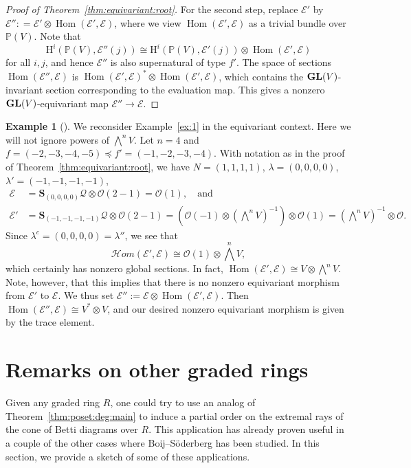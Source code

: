 \documentclass[12pt]{amsart}
\theoremstyle{definition}
\newtheorem{eg}[equation]{Example}
\newenvironment{example}[1][]{\begin{eg}[#1] \pushQED{\qed}}{\popQED \end{eg}}
\newcommand{\Hom}{\operatorname{Hom}}
\newcommand{\sheafHom}{\mathcal{H}om}
\newcommand{\Hs}{\mathrm{H}}
\newcommand{\EE}{\mathcal{E}}
\newcommand{\cO}{{\mathcal O}}
\newcommand{\PP}{\mathbb{P}}
\newcommand{\cQ}{\mathcal{Q}}
\newcommand{\Sc}{\mathbf{S}}
\newcommand{\GL}{{\bf GL}}
\begin{document}
\begin{proof}[Proof of Theorem~\ref{thm:equivariant:root}]
For the second step, replace $\EE'$ by $\EE'' : = \EE' \otimes
\Hom(\EE', \EE)$, where we view $\Hom(\EE', \EE)$ as a trivial bundle
over $\PP(V)$.  Note that
\[
\Hs^i(\PP(V),\EE''(j))\cong \Hs^i(\PP(V),\EE'(j))\otimes \Hom(\EE',
\EE)
\]
for all $i,j$, and hence $\EE''$ is also supernatural of type $f'$.
The space of sections $\Hom(\EE'', \EE)$ is $\Hom(\EE', \EE)^* \otimes
\Hom(\EE', \EE)$, which contains the $\GL(V)$-invariant section
corresponding to the evaluation map. This gives a nonzero
$\GL(V)$-equivariant map $\EE'' \to \EE$.
\end{proof}

\begin{example}
  We reconsider Example~\ref{ex:1} in the equivariant context. Here we
  will not ignore powers of $\bigwedge^n V$.  Let $n=4$ and
  $f=(-2,-3,-4,-5) \preceq f'=(-1,-2,-3,-4)$.  With notation as in the
  proof of Theorem~\ref{thm:equivariant:root}, we have $N=(1,1,1,1)$,
  $\lambda=(0,0,0,0)$, $\lambda'=(-1,-1,-1,-1)$,
  \begin{align*}
    \EE&=\Sc_{(0,0,0,0)}\cQ \otimes \cO(2-1)=\cO(1), \quad \text{and}\\
    \EE'&=\Sc_{(-1,-1,-1,-1)}\cQ \otimes \cO(2-1) = \left(\cO(-1)
      \otimes \left(\bigwedge^n V\right)^{-1} \right) \otimes \cO(1)
      =\left(\bigwedge^n V\right)^{-1} \otimes \cO.
  \end{align*}
  Since $\lambda^c=(0,0,0,0)=\lambda''$, we see that
  \[
  \sheafHom(\EE',\EE)\cong \cO(1) \otimes \bigwedge^n V,
  \]
  which certainly has nonzero global sections.  In fact,
  $\Hom(\EE',\EE)\cong V \otimes \bigwedge^n V$.  Note, however, that
  this implies that there is no nonzero equivariant morphism from
  $\EE'$ to $\EE$. We thus set $\EE'':=\EE\otimes \Hom(\EE',\EE)$.
  Then $\Hom(\EE'',\EE)\cong V^*\otimes V$, and our desired nonzero
  equivariant morphism is given by the trace element.
\end{example}


\section{Remarks on other graded rings}%
\label{sec:extensions}

Given any graded ring $R$, one could try to use an analog of
Theorem~\ref{thm:poset:deg:main} to induce a partial order on
the extremal rays of the cone of Betti diagrams over $R$.  This
application has already proven useful in a couple of the other cases
where Boij--S\"oderberg has been studied.  In this section, we provide
a sketch of some of these applications.
\end{document}
